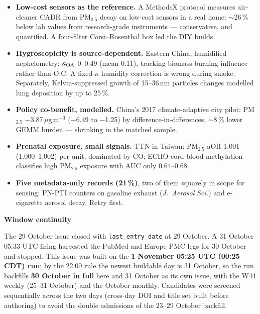 \documentclass[10pt]{article}
\begin{document}
\footnotesize
\begin{itemize}

\item \textbf{Low-cost sensors as the reference.} A MethodsX protocol measures air-cleaner CADR from PM$_{2.5}$ decay on
low-cost sensors in a real home: $\sim$26\,\% below lab values from research-grade instruments --- conservative, and
quantified. A four-filter Corsi--Rosenthal box led the DIY builds.

\item \textbf{Hygroscopicity is source-dependent.} Eastern China, humidified nephelometry: $\kappa_{\rm OA}$ 0--0.49
(mean 0.11), tracking biomass-burning influence rather than O:C. A fixed-$\kappa$ humidity correction is wrong during
smoke. Separately, Kelvin-suppressed growth of 15--36\,nm particles changes modelled lung deposition by up to 25\,\%.

\item \textbf{Policy co-benefit, modelled.} China's 2017 climate-adaptive city pilot: PM$_{2.5}$ $-$3.87\,$\mu$g\,m$^{-3}$
($-$6.49 to $-$1.25) by difference-in-differences, $\sim$8\,\% lower GEMM burden --- shrinking in the matched sample.

\item \textbf{Prenatal exposure, small signals.} TTN in Taiwan: PM$_{2.5}$ aOR 1.001 (1.000--1.002) per unit, dominated by
CO; ECHO cord-blood methylation classifies high PM$_{2.5}$ exposure with AUC only 0.64--0.68.

\item \textbf{Five metadata-only records (21\,\%)}, two of them squarely in scope for sensing: PN-PTI counters on gasoline
exhaust (\emph{J.\ Aerosol Sci.}) and e-cigarette aerosol decay. Retry first.

\end{itemize}

\vspace{2mm}

\begin{keybox}
{\sffamily\bfseries\footnotesize\color{Deep}Window continuity}\\[1.2mm]
{\fontsize{7.2}{8.8}\selectfont
The 29 October issue closed with \texttt{last\_entry\_date} at 29 October. A 31 October 05:33 UTC firing harvested
the PubMed and Europe PMC legs for 30 October and stopped. This issue was built on the \textbf{1 November 05:25 UTC
(00:25 CDT) run}; by the 22:00 rule the newest buildable day is 31 October, so the run backfills \textbf{30 October in
full} here and 31 October as its own issue, with the W44 weekly (25--31 October) and the October monthly. Candidates
were screened sequentially across the two days (cross-day DOI and title set built before authoring) to avoid the
double admissions of the 23--29 October backfill.\par}
\end{keybox}
\end{document}
